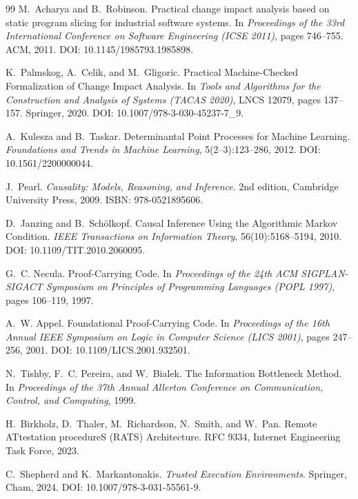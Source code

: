 \documentclass[11pt]{article}
\theoremstyle{definition}
\newcommand{\1}{\mathbf{1}}
\begin{document}
\begin{thebibliography}{99}
M.~Acharya and B.~Robinson.
\newblock Practical change impact analysis based on static program slicing for industrial software systems.
\newblock In \emph{Proceedings of the 33rd International Conference on Software Engineering (ICSE 2011)}, pages 746--755. ACM, 2011. DOI: 10.1145/1985793.1985898.

K.~Palmskog, A.~Celik, and M.~Gligoric.
\newblock Practical Machine-Checked Formalization of Change Impact Analysis.
\newblock In \emph{Tools and Algorithms for the Construction and Analysis of Systems (TACAS 2020)}, LNCS 12079, pages 137--157. Springer, 2020. DOI: 10.1007/978-3-030-45237-7\_9.

A.~Kulesza and B.~Taskar.
\newblock Determinantal Point Processes for Machine Learning.
\newblock \emph{Foundations and Trends in Machine Learning}, 5(2--3):123--286, 2012. DOI: 10.1561/2200000044.


J.~Pearl.
\newblock \emph{Causality: Models, Reasoning, and Inference}.
\newblock 2nd edition, Cambridge University Press, 2009. ISBN: 978-0521895606.

D.~Janzing and B.~Sch{\"o}lkopf.
\newblock Causal Inference Using the Algorithmic Markov Condition.
\newblock \emph{IEEE Transactions on Information Theory}, 56(10):5168--5194, 2010. DOI: 10.1109/TIT.2010.2060095.

G.~C. Necula.
\newblock Proof-Carrying Code.
\newblock In \emph{Proceedings of the 24th ACM SIGPLAN-SIGACT Symposium on Principles of Programming Languages (POPL 1997)}, pages 106--119, 1997.

A.~W. Appel.
\newblock Foundational Proof-Carrying Code.
\newblock In \emph{Proceedings of the 16th Annual IEEE Symposium on Logic in Computer Science (LICS 2001)}, pages 247--256, 2001. DOI: 10.1109/LICS.2001.932501.

N.~Tishby, F.~C. Pereira, and W.~Bialek.
\newblock The Information Bottleneck Method.
\newblock In \emph{Proceedings of the 37th Annual Allerton Conference on Communication, Control, and Computing}, 1999.

H.~Birkholz, D.~Thaler, M.~Richardson, N.~Smith, and W.~Pan.
\newblock Remote ATtestation procedureS (RATS) Architecture.
\newblock RFC 9334, Internet Engineering Task Force, 2023.

C.~Shepherd and K.~Markantonakis.
\newblock \emph{Trusted Execution Environments}.
\newblock Springer, Cham, 2024. DOI: 10.1007/978-3-031-55561-9.


\end{thebibliography}
\end{document}
